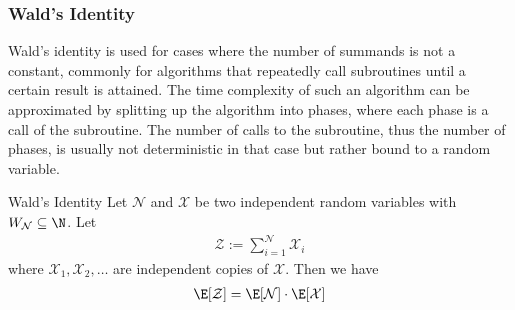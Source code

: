 \subsubsection{Wald's Identity}
Wald's identity is used for cases where the number of summands is not a constant, commonly for algorithms that repeatedly call subroutines until a certain result is attained.
The time complexity of such an algorithm can be approximated by splitting up the algorithm into phases, where each phase is a call of the subroutine.
The number of calls to the subroutine, thus the number of phases, is usually not deterministic in that case but rather bound to a random variable.

\setcounter{all}{65}
\begin{theorem}[]{Wald's Identity}
    Let $\mathcal{N}$ and $\mathcal{X}$ be two independent random variables with $W_{\mathcal{N}} \subseteq \N$. Let
    \begin{align*}
        \mathcal{Z} := \sum_{i = 1}^{\mathcal{N}}\mathcal{X}_i
    \end{align*}
    where $\mathcal{X}_1, \mathcal{X}_2, \ldots$ are independent copies of $\mathcal{X}$. Then we have
    \begin{align*}
        \E[\mathcal{Z}] = \E[\mathcal{N}] \cdot \E[\mathcal{X}]
    \end{align*}
\end{theorem}
